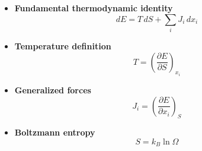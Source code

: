 \documentclass[9pt,twocoloumn]{article}
\begin{document}
\begin{itemize}
\item \textbf{Fundamental thermodynamic identity}
\[
dE = T\,dS + \sum_i J_i\,dx_i
\]

\item \textbf{Temperature definition}
\[
T = \left(\frac{\partial E}{\partial S}\right)_{x_i}
\]

\item \textbf{Generalized forces}
\[
J_i = \left(\frac{\partial E}{\partial x_i}\right)_S
\]

\item \textbf{Boltzmann entropy}
\[
S = k_B \ln \Omega
\]

\end{itemize}
\end{document}
